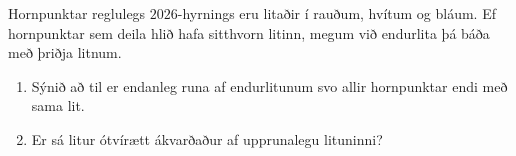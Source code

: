 Hornpunktar reglulegs $2026$-hyrnings eru litaðir í rauðum, hvítum og bláum. Ef hornpunktar sem deila hlið hafa sitthvorn litinn, megum við endurlita þá báða með þriðja litnum.
\begin{enumerate}[label=\alph*.]
\item 
Sýnið að til er endanleg runa af endurlitunum svo allir hornpunktar endi með sama lit.
\item
Er sá litur ótvírætt ákvarðaður af upprunalegu lituninni?
\end{enumerate}